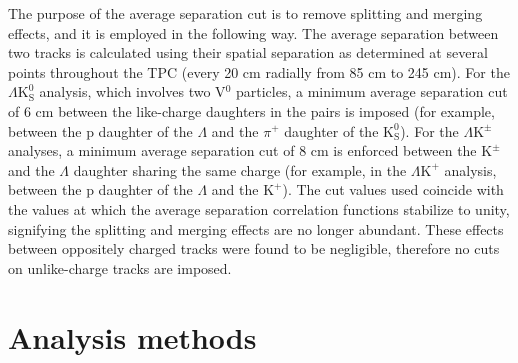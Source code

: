 \documentclass[ALICE,manyauthors]{cernphprep}
\newcommand{\Lam}{$\Lambda$\xspace}
\newcommand{\KchP}{$\mathrm{K^{+}}$\xspace}
\newcommand{\Kpm}{$\mathrm{K^{\pm}}$\xspace}
\newcommand{\Ks}{$\mathrm{K^{0}_{S}}$\xspace}
\newcommand{\LamKchP}{$\Lambda\mathrm{K^{+}}$\xspace}
\newcommand{\LamKpm}{$\Lambda\mathrm{K^{\pm}}$\xspace}
\newcommand{\LamKs}{$\Lambda\mathrm{K^{0}_{S}}$\xspace}
\newcommand{\Vz}{V$^{0}$\xspace}
\begin{document}
The purpose of the average separation cut is to remove splitting and merging effects, and it is employed in the following way.  
The average separation between two tracks is calculated using their spatial separation as determined at several points throughout the TPC (every 20 cm radially from 85 cm to 245 cm).
For the \LamKs analysis, which involves two \Vz particles, a minimum average separation cut of 6 cm between the like-charge daughters in the pairs is imposed (for example, between the p daughter of the \Lam and the $\pi^{+}$ daughter of the \Ks).
For the \LamKpm analyses, a minimum average separation cut of 8 cm is enforced between the \Kpm and the \Lam daughter sharing the same charge (for example, in the \LamKchP analysis, between the p daughter of the \Lam and the \KchP).
The cut values used coincide with the values at which the average separation correlation functions stabilize to unity, signifying the splitting and merging effects are no longer abundant.
These effects between oppositely charged tracks were found to be negligible, therefore no cuts on unlike-charge tracks are imposed.

\section{Analysis methods}
\label{sec:AnalysisMethods}

\end{document}
